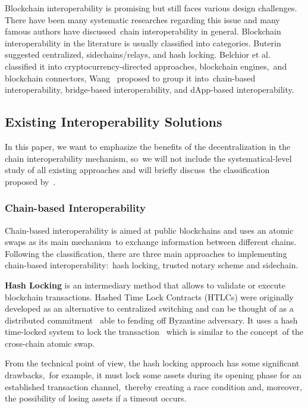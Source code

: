 Blockchain interoperability is promising but still faces various design challenges.
There have been many systematic researches regarding this issue and many famous authors have discussed\
chain interoperability in general.
Blockchain interoperability in the literature is usually classified into categories.
Buterin~\cite{buterin2016} suggested centralized, sidechains/relays, and hash locking.
Belchior et al.~\cite{belchior2021survey} classified it into cryptocurrency-directed approaches, blockchain engines,\
and blockchain connectors, Wang~\cite{cryptoeprint:2021/537} proposed to group it into\
chain-based interoperability, bridge-based interoperability, and dApp-based interoperability.

\subsection{Existing Interoperability Solutions}\label{subsec:interoperability-categories}
In this paper, we want to emphasize the benefits of the decentralization in the chain interoperability mechanism, so\
we will not include the systematical-level study of all existing approaches and will briefly discuss\
the classification proposed by~\cite{cryptoeprint:2021/537}.

\subsubsection{Chain-based Interoperability}
Chain-based interoperability is aimed at public blockchains and uses an atomic swaps as its main mechanism\
to exchange information between different chains.
Following the classification, there are three main approaches to implementing chain-based interoperability:\
hash locking, trusted notary scheme and sidechain.

\textbf{Hash Locking} is an intermediary method that allows to validate or execute blockchain transactions.
Hashed Time Lock Contracts (HTLCs) were originally developed as an alternative to centralized switching
and can be thought of as a distributed commitment~\cite{Kumar2021} able to fending off Byzantine adversary.
It uses a hash time-locked system to lock the transaction~\cite{Pillai2019} which is similar to the concept\
of the cross-chain atomic swap.

From the technical point of view, the hash locking approach has some significant drawbacks,\
for example, it must lock some assets during its opening phase for an established transaction channel,\
thereby creating a race condition and, moreover, the possibility of losing assets if a timeout occurs.

